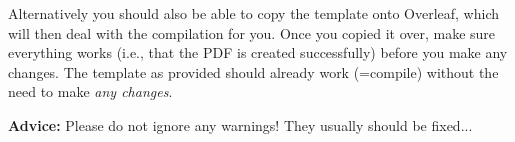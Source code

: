 Alternatively you should also be able to copy the template onto Overleaf, which will then deal with the compilation for you. Once you copied it over, make sure everything works (i.e., that the PDF is created successfully) before you make any changes. The template as provided should already work (=compile) without the need to make \emph{any changes}.

\textbf{Advice:} Please do not ignore any warnings! They usually should be fixed...